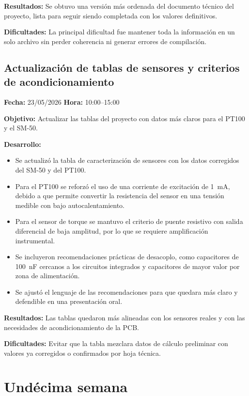\documentclass[12pt]{article}
\begin{document}
\textbf{Resultados:}
Se obtuvo una versión más ordenada del documento técnico del proyecto, lista para seguir siendo completada con los valores definitivos.

\textbf{Dificultades:}
La principal dificultad fue mantener toda la información en un solo archivo sin perder coherencia ni generar errores de compilación.

\subsection{Actualización de tablas de sensores y criterios de acondicionamiento}
\textbf{Fecha:} 23/05/2026 \quad \textbf{Hora:} 10:00--15:00

\textbf{Objetivo:}
Actualizar las tablas del proyecto con datos más claros para el PT100 y el SM-50.

\textbf{Desarrollo:}
\begin{itemize}
\item Se actualizó la tabla de caracterización de sensores con los datos corregidos del SM-50 y del PT100.
\item Para el PT100 se reforzó el uso de una corriente de excitación de \SI{1}{mA}, debido a que permite convertir la resistencia del sensor en una tensión medible con bajo autocalentamiento.
\item Para el sensor de torque se mantuvo el criterio de puente resistivo con salida diferencial de baja amplitud, por lo que se requiere amplificación instrumental.
\item Se incluyeron recomendaciones prácticas de desacoplo, como capacitores de \SI{100}{nF} cercanos a los circuitos integrados y capacitores de mayor valor por zona de alimentación.
\item Se ajustó el lenguaje de las recomendaciones para que quedara más claro y defendible en una presentación oral.
\end{itemize}

\textbf{Resultados:}
Las tablas quedaron más alineadas con los sensores reales y con las necesidades de acondicionamiento de la PCB.

\textbf{Dificultades:}
Evitar que la tabla mezclara datos de cálculo preliminar con valores ya corregidos o confirmados por hoja técnica.

\section{Undécima semana}
\end{document}
